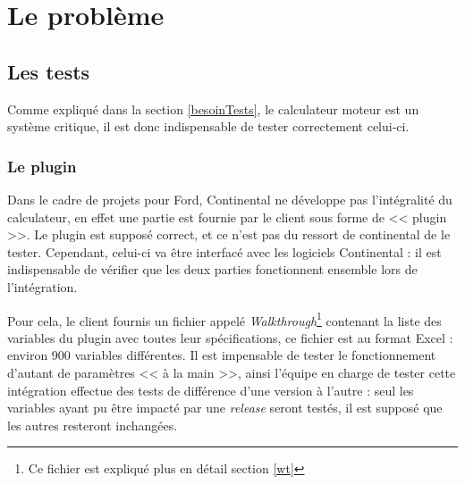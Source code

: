 \chapter{Le problème} \label{chapPb}
	\section{Les tests} \label{pbTests}
	Comme expliqué dans la section \ref{besoinTests}, le calculateur moteur est un système critique, il est donc indispensable de tester correctement celui-ci.

	\subsection{Le plugin}
	Dans le cadre de projets pour Ford, Continental ne développe pas l'intégralité du calculateur, en effet une partie est fournie par le client sous forme de << plugin >>. Le plugin est supposé correct, et ce n'est pas du ressort de continental de le tester. Cependant, celui-ci va être interfacé avec les logiciels Continental : il est indispensable de vérifier que les deux parties fonctionnent ensemble lors de l'intégration.

	Pour cela, le client fournis un fichier appelé \textit{Walkthrough}\footnote{Ce fichier est expliqué plus en détail section \ref{wt}} contenant la liste des variables du plugin avec toutes leur spécifications, ce fichier est au format Excel : environ 900 variables différentes. Il est impensable de tester le fonctionnement d'autant de paramètres << à la main >>, ainsi l'équipe en charge de tester cette intégration effectue des tests de différence d'une version à l'autre : seul les variables ayant pu être impacté par une \textit{release} seront testés, il est supposé que les autres resteront inchangées.

